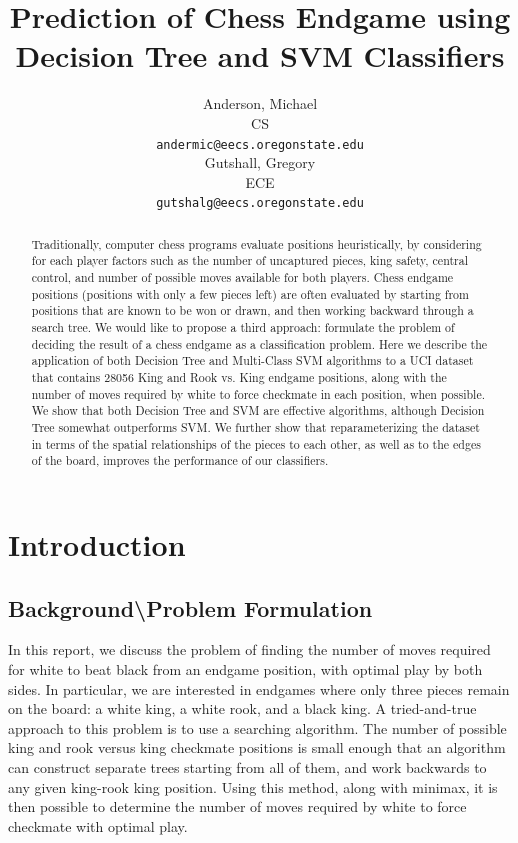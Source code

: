 \documentclass[fleqn]{article}
\title{Prediction of Chess Endgame using\\
Decision Tree and SVM Classifiers}
\author{
Anderson, Michael\\
CS\\ 
\texttt{andermic@eecs.oregonstate.edu} \\
\AND
Gutshall, Gregory\\
ECE\\
\texttt{gutshalg@eecs.oregonstate.edu} \\
}
\begin{document}
\maketitle

\begin{abstract}
Traditionally, computer chess programs evaluate positions heuristically, by considering for each player factors such as the number of uncaptured pieces, king safety, central control, and number of possible moves available for both players. Chess endgame positions (positions with only a few pieces left) are often evaluated by starting from positions that are known to be won or drawn, and then working backward through a search tree. We would like to propose a third approach: formulate the problem of deciding the result of a chess endgame as a classification problem. Here we describe the application of both Decision Tree and Multi-Class SVM algorithms to a UCI dataset\cite{MichaelBain:1994} that contains 28056 King and Rook vs. King endgame positions, along with the number of moves required by white to force checkmate in each position, when possible. We show that both Decision Tree and SVM are effective algorithms, although Decision Tree somewhat outperforms SVM. We further show that reparameterizing the dataset in terms of the spatial relationships of the pieces to each other, as well as to the edges of the board, improves the performance of our classifiers.
\end{abstract}

\section{Introduction}
\label{sec:Intro}
%
\subsection[Background]{Background\textbackslash Problem Formulation}
\label{subsec:Background}
In this report, we discuss the problem of finding the number of moves required for white to beat black from an endgame position, with optimal play by both sides. In particular, we are interested in endgames where only three pieces remain on the board: a white king, a white rook, and a black king. A tried-and-true approach to this problem is to use a searching algorithm. The number of possible king and rook versus king checkmate positions is small enough that an algorithm can construct separate trees starting from all of them, and work backwards to any given king-rook king position. Using this method, along with minimax, it is then possible to determine the number of moves required by white to force checkmate with optimal play.
\end{document}

